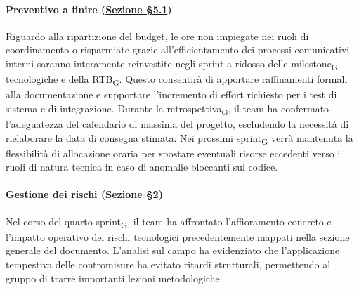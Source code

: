 ﻿\documentclass[a4paper, 10pt, colorlinks=true, linkcolor=black, urlcolor=blue, citecolor=blue, hidelinks]{article}
\begin{document}
\paragraph{Preventivo a finire (\hyperref[tab:preventivo-finire]{Sezione \S5.1})}
Riguardo alla ripartizione del budget, le ore non impiegate nei ruoli di coordinamento o risparmiate grazie all'efficientamento dei processi comunicativi interni saranno interamente reinvestite negli sprint a ridosso delle milestone\textsubscript{G} tecnologiche e della RTB\textsubscript{G}. Questo consentirà di apportare raffinamenti formali alla documentazione e supportare l'incremento di effort richiesto per i test di sistema e di integrazione. Durante la retrospettiva\textsubscript{G}, il team ha confermato l'adeguatezza del calendario di massima del progetto, escludendo la necessità di rielaborare la data di consegna stimata. Nei prossimi sprint\textsubscript{G} verrà mantenuta la flessibilità di allocazione oraria per spostare eventuali risorse eccedenti verso i ruoli di natura tecnica in caso di anomalie bloccanti sul codice.

\paragraph{Gestione dei rischi (\hyperref[tab:gestione-rischi]{Sezione \S2})}
Nel corso del quarto sprint\textsubscript{G}, il team ha affrontato l'affioramento concreto e l'impatto operativo dei rischi tecnologici precedentemente mappati nella sezione generale del documento. L'analisi sul campo ha evidenziato che l'applicazione tempestiva delle contromisure ha evitato ritardi strutturali, permettendo al gruppo di trarre importanti lezioni metodologiche.
\end{document}
